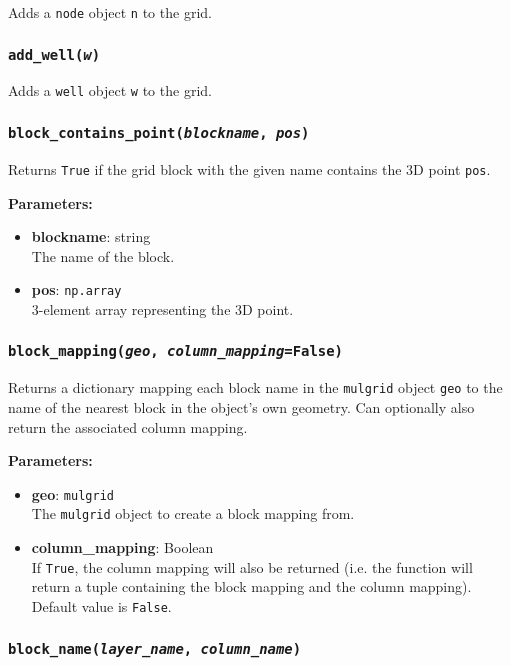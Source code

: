 Adds a \texttt{node} object \texttt{n} to the grid.

\subsubsection{\texttt{add\_well(\emph{w})}}

Adds a \texttt{well} object \texttt{w} to the grid.

\subsubsection{\texttt{block\_contains\_point(\emph{blockname}, \emph{pos})}}

Returns \texttt{True} if the grid block with the given name contains the 3D point \texttt{pos}.

\textbf{Parameters:}
\begin{itemize}
\item \textbf{blockname}: string\\
  The name of the block.
\item \textbf{pos}: \texttt{np.array}\\
  3-element array representing the 3D point.
\end{itemize}

\subsubsection{\texttt{block\_mapping(\emph{geo}, \emph{column\_mapping}=\texttt{False})}}

Returns a dictionary mapping each block name in the \texttt{mulgrid} object \texttt{geo} to the name of the nearest block in the object's own geometry.  Can optionally also return the associated column mapping.

\textbf{Parameters:}
\begin{itemize}
\item \textbf{geo}: \texttt{mulgrid}\\
  The \texttt{mulgrid} object to create a block mapping from.
\item \textbf{column\_mapping}: Boolean\\
  If \texttt{True}, the column mapping will also be returned (i.e. the function will return a tuple containing the block mapping and the column mapping).  Default value is \texttt{False}.
\end{itemize}

\subsubsection{\texttt{block\_name(\emph{layer\_name}, \emph{column\_name})}}

